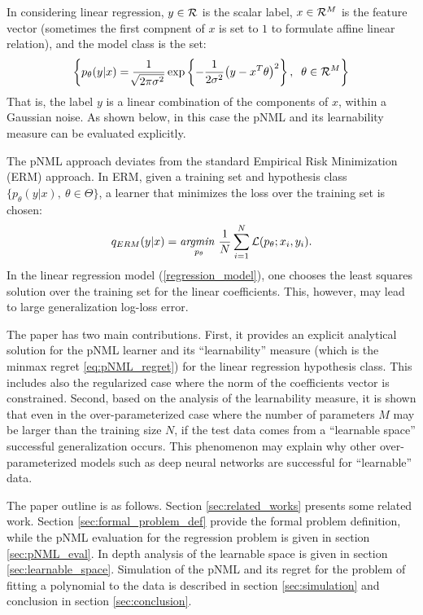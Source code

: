 \documentclass[conference,letterpaper]{IEEEtran}
\begin{document}
In considering linear regression, $y\in {\cal R}$ is the scalar label, $x\in {\cal R}^M$ is the feature vector (sometimes the first compnent of $x$ is set to $1$ to formulate affine linear relation), and the model class is the set:
\begin{equation} \label{regression_model}
\left\{ p_{\theta}(y|x) 
=\frac{1}{\sqrt[]{2\pi\sigma^2}}\exp\left\{-\frac{1}{2\sigma^2}\big(y- x^T\theta \big)^2\right\}, \;\; \theta \in {\cal R}^M \right\} 
\end{equation}
That is, the label $y$ is a linear combination of the components of $x$, within a Gaussian noise. As shown below, in this case the pNML and its learnability measure can be evaluated explicitly.

The pNML approach deviates from the standard Empirical Risk Minimization (ERM) \cite{vapnik1992principles} approach.
In ERM, given a training set and hypothesis class $\{p_\theta(y|x),\ \theta \in \Theta\}$, a learner that minimizes the loss over the training set is chosen:
\begin{equation}
q_{\mbox{\tiny{ERM}}}(y|x) = \underset{p_\theta}{\textit{argmin }} \frac{1}{N}\sum_{i=1}^{N}  \mathcal{L}(p_\theta; x_i, y_i).
\end{equation}
In the linear regression model (\ref{regression_model}), one chooses the least squares solution over the training set for the linear coefficients. This, however, may lead to large generalization log-loss error.

The paper has two main contributions.
First, it provides an explicit analytical solution for the pNML learner and its ``learnability'' measure (which is the minmax regret \ref{eq:pNML_regret}) for the linear regression hypothesis class. This includes also the regularized case where the norm of the coefficients vector is constrained. Second, based on the analysis of the learnability measure, it is shown that even in the over-parameterized case where the number of parameters $M$ may be larger than the training size $N$, if the test data comes from a ``learnable space'' successful generalization occurs.
This phenomenon may explain why other over-parameterized models such as deep neural networks are successful for ``learnable'' data.

The paper outline is as follows.
Section \ref{sec:related_works} presents some related work. Section \ref{sec:formal_problem_def} provide the formal problem definition, while the pNML evaluation for the regression problem is given in section \ref{sec:pNML_eval}. In depth analysis of the learnable space is given in section \ref{sec:learnable_space}. Simulation of the pNML and its regret for the problem of fitting a polynomial to the data is described in section \ref{sec:simulation} and conclusion in section \ref{sec:conclusion}.
\end{document}
